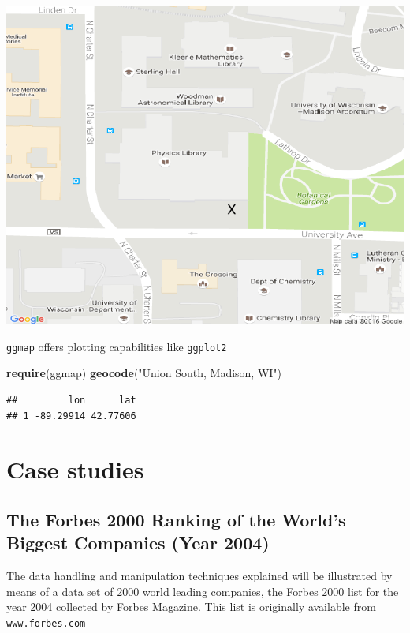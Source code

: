 \documentclass[]{article}
\newenvironment{Shaded}{\begin{snugshade}}{\end{snugshade}}
\newcommand{\KeywordTok}[1]{\textcolor[rgb]{0.13,0.29,0.53}{\textbf{{#1}}}}
\newcommand{\StringTok}[1]{\textcolor[rgb]{0.31,0.60,0.02}{{#1}}}
\newcommand{\NormalTok}[1]{{#1}}
\numberwithin{equation}{section}
\begin{document}
\includegraphics{index_files/figure-latex/unnamed-chunk-240-1.pdf}

\texttt{ggmap} offers plotting capabilities like \texttt{ggplot2}

\begin{Shaded}
\begin{Highlighting}[]
\KeywordTok{require}\NormalTok{(ggmap)}
\KeywordTok{geocode}\NormalTok{(}\StringTok{"Union South, Madison, WI"}\NormalTok{)}
\end{Highlighting}
\end{Shaded}

\begin{verbatim}
##         lon      lat
## 1 -89.29914 42.77606
\end{verbatim}

\section{Case studies}\label{case-studies}

\subsection{The Forbes 2000 Ranking of the World's Biggest Companies
(Year
2004)}\label{the-forbes-2000-ranking-of-the-worlds-biggest-companies-year-2004}

The data handling and manipulation techniques explained will be
illustrated by means of a data set of 2000 world leading companies, the
Forbes 2000 list for the year 2004 collected by Forbes Magazine. This
list is originally available from \texttt{www.forbes.com}
\end{document}
